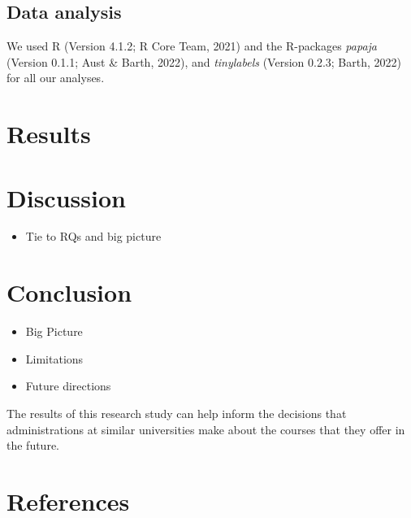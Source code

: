 \documentclass[
  man]{apa6}
\providecommand{\tightlist}{%
  \setlength{\itemsep}{0pt}\setlength{\parskip}{0pt}}
\begin{document}
\hypertarget{data-analysis}{%
\subsection{Data analysis}\label{data-analysis}}

We used R (Version 4.1.2; R Core Team, 2021) and the R-packages \emph{papaja} (Version 0.1.1; Aust \& Barth, 2022), and \emph{tinylabels} (Version 0.2.3; Barth, 2022) for all our analyses.

\hypertarget{results}{%
\section{Results}\label{results}}

\hypertarget{discussion}{%
\section{Discussion}\label{discussion}}

\begin{itemize}
\tightlist
\item
  Tie to RQs and big picture
\end{itemize}

\hypertarget{conclusion}{%
\section{Conclusion}\label{conclusion}}

\begin{itemize}
\item
  Big Picture
\item
  Limitations
\item
  Future directions
\end{itemize}

The results of this research study can help inform the decisions that administrations at similar universities make about the courses that they offer in the future.

\newpage

\hypertarget{references}{%
\section{References}\label{references}}
\end{document}

